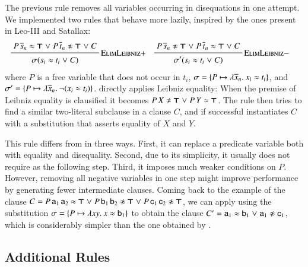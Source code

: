 The previous rule removes all variables occurring in disequations in one
attempt. We implemented two rules that behave more lazily, inspired by the ones present in Leo-III and
Satallax:
%
\begin{align*}
&\namedinference{ElimLeibniz$+$}
{P \, \tuplen{s} \eq \itrue \llor P \, \tuplen{t} \noteq \itrue \llor C}
{\sigmacl{s_i \eq t_i \llor C}}
&&
\namedinference{ElimLeibniz$-$}
{P \, \tuplen{s} \noteq \itrue \llor P \, \tuplen{t} \eq \itrue \llor C}
{\substcl{\sigma'}{s_i \eq t_i \llor C}}&
\end{align*}
%
where $P$ is a free variable that does not occur in $t_i$, $\sigma = \{ P
\mapsto \lambda \overline{x}_{n}.\> x_i \approx t_i \}$, and $\sigma' = \{ P \mapsto
\lambda \overline{x}_{n}.\> \neg (x_i \approx t_i) \}$.  directly applies
Leibniz equality: When the premise of Leibniz equality is clausified it
becomes $P \, X \not\approx \pmb{\top} \mathrel\lor P \, Y \approx \pmb{\top}$. The rule then tries to find
a similar two-literal subclause in a clause $C$, and if successful instantiates $C$ with a
substitution that asserts equality of $X$ and $Y$.


This rule differs from
 in three ways. First, it can replace a predicate variable
both with equality and disequality. Second, due to its simplicity, it usually
does not require  as the following step. Third, it imposes much
weaker conditions on $P$. However, removing all negative variables in one step
might improve performance  by generating fewer intermediate clauses.  Coming
back to the example of the clause $C = P \, \mathsf{a}_1 \, \mathsf{a}_2 \approx \pmb{\top} \mathrel\lor
P \, \mathsf{b}_1 \, \mathsf{b}_2 \not\approx \pmb{\top} \mathrel\lor P \, \mathsf{c}_1 \, \mathsf{c}_2
\not\approx \pmb{\top}$, we can apply  using the substitution
$\sigma = \{ P \mapsto \lambda xy.\> x \approx \mathsf{b}_1 \}$ to obtain the clause $C' =
\mathsf{a}_1 \approx \mathsf{b}_1 \mathrel\lor \mathsf{a}_1 \not\approx \mathsf{c}_1$, which is considerably simpler than
the one obtained by .



\subsection{Additional Rules}
\label{subsect:bool:core}
 
